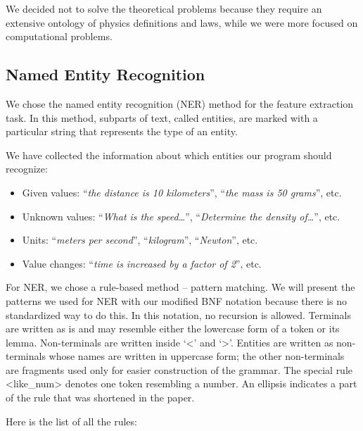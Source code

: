 \documentclass[a4paper, 12pt]{article}
\newcommand{\etext}[1]{\enquote{\textit{#1}}}
\begin{document}
	We decided not to solve the theoretical problems because they require an
	extensive ontology of physics definitions and laws, while we were more
	focused on computational problems.
	
	\subsection{Named Entity Recognition}
	
	We chose the named entity recognition (NER) method for the feature
	extraction task. In this method, subparts of text, called entities, are
	marked with a particular string that represents the type of an entity.
	
	We have collected the information about which entities our program
	should recognize:
	
	\begin{itemize}
	\item
	  Given values: \etext{the distance is 10 kilometers}, \etext{the
	  mass is 50 grams}, etc.
	\item
	  Unknown values: \etext{What is the speed\ldots{}},
	  \etext{Determine the density of\ldots{}}, etc.
	\item
	  Units: \etext{meters per second}, \etext{kilogram}, \etext{Newton}, etc.
	\item
	  Value changes: \etext{time is increased by a factor of 2}, etc.
	\end{itemize}
	
	For NER, we chose a rule-based method -- pattern matching. We will
	present the patterns we used for NER with our modified BNF notation
	because there is no standardized way to do this. In this notation, no
	recursion is allowed. Terminals are written as is and may resemble
	either the lowercase form of a token or its lemma. Non-terminals are
	written inside `\textless' and `\textgreater'. Entities are written as
	non-terminals whose names are written in uppercase form; the other
	non-terminals are fragments used only for easier construction of the
	grammar. The special rule \textless like\_num\textgreater{} denotes one
	token resembling a number. An ellipsis indicates a part of the rule that
	was shortened in the paper.
	
	Here is the list of all the rules:
	
\end{document}
